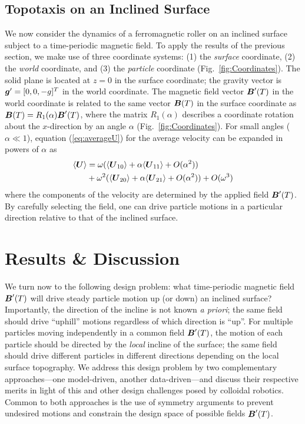 \subsection{Topotaxis on an Inclined Surface}

We now consider the dynamics of a ferromagnetic roller on an inclined surface subject to a time-periodic magnetic field. To apply the results of the previous section, we make use of three coordinate systems: (1) the \emph{surface} coordinate, (2) the \emph{world} coordinate, and (3) the \emph{particle} coordinate (Fig.~\ref{fig:Coordinates}).  The solid plane is located at $z=0$ in the surface coordinate; the gravity vector is $\boldsymbol{g}'=[0,0, -g]^T$ in the world coordinate.  The  magnetic field vector $\boldsymbol{B}'(T)$ in the world coordinate is related to the same vector $\boldsymbol{B}(T)$ in the surface coordinate as $\boldsymbol{B}(T)=R_1(\alpha)\boldsymbol{B}'(T)$, where the matrix $R_1(\alpha)$ describes a coordinate rotation about the $x$-direction by an angle $\alpha$ (Fig.~\ref{fig:Coordinates}). For small angles ($\alpha\ll 1$), equation (\ref{eq:averageU}) for the average velocity can be expanded in powers of $\alpha$ as 
\begin{align}
\begin{split}
    \langle\boldsymbol{U}\rangle &= \omega( \langle\boldsymbol{U}_{10}\rangle + \alpha \langle\boldsymbol{U}_{11}\rangle + O(\alpha^2) ) 
    \\
    &+ \omega^2( \langle\boldsymbol{U}_{20}\rangle + \alpha \langle\boldsymbol{U}_{21}\rangle + O(\alpha^2) ) + O(\omega^3)
\end{split}
\end{align}
where the components of the velocity are determined by the applied field $\boldsymbol{B}'(T)$. By carefully selecting the field, one can drive particle motions in a particular direction relative to that of the inclined surface.  

\section{Results \& Discussion}

We turn now to the following design problem: what time-periodic magnetic field $\boldsymbol{B}'(T)$ will drive steady particle motion up (or down) an inclined surface?  Importantly, the direction of the incline is not known \emph{a priori}; the same field should drive ``uphill'' motions regardless of which direction is ``up''.  For multiple particles moving independently in a common field $\boldsymbol{B}'(T)$, the motion of each particle should be directed by the \emph{local} incline of the surface; the same field should drive different particles in different directions depending on the local surface topography. We address this design problem by two complementary approaches---one model-driven, another data-driven---and discuss their respective merits in light of this and other design challenges posed by colloidal robotics. Common to both approaches is the use of symmetry arguments to prevent undesired motions and constrain the design space of possible fields $\boldsymbol{B}'(T)$.  

